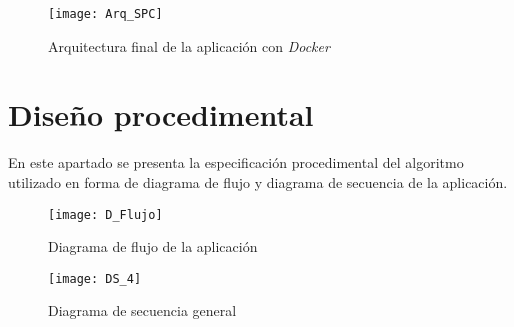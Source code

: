 \begin{figure}[H]
	\centering
	\texttt{[image: Arq\_SPC]}
	\caption{Arquitectura final de la aplicación con \emph{Docker}}
	\label{fig:Arq_SPC}
\end{figure}

\section{Diseño procedimental}

En este apartado se presenta la especificación procedimental del algoritmo utilizado en forma de diagrama de flujo y diagrama de secuencia de la aplicación.


\begin{figure}[H]
	\centering
	\texttt{[image: D\_Flujo]}
	\caption{Diagrama de flujo de la aplicación}
	\label{fig:D_Flujo}
\end{figure}

\begin{figure}[H]
	\centering
	\texttt{[image: DS\_4]}
	\caption{Diagrama de secuencia general}
	\label{fig:DS_4}
\end{figure}